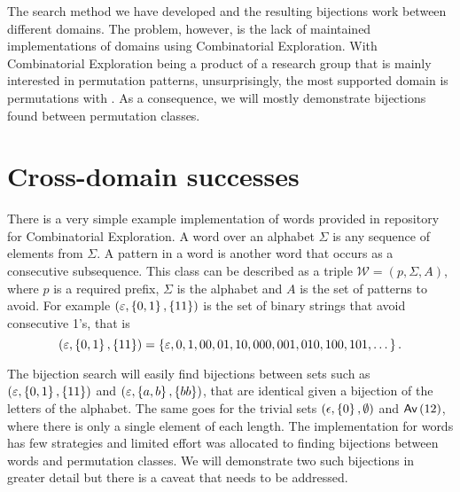 
\label{ch:results}
The search method we have developed and the resulting bijections work between different domains. The problem, however, is the lack of maintained implementations of domains using Combinatorial Exploration. With Combinatorial Exploration being a product of a research group that is mainly interested in permutation patterns, unsurprisingly, the most supported domain is permutations with \tsc{}. As a consequence, we will mostly demonstrate bijections found between permutation classes.

\section{Cross-domain successes}
There is a very simple example implementation of words provided in repository for Combinatorial Exploration. A word over an alphabet $\Sigma$ is any sequence of elements from $\Sigma$. A pattern in a word is another word that occurs as a consecutive subsequence. This class can be described as a triple $\mathcal{W} = (p, \Sigma, A)$, where $p$ is a required prefix, $\Sigma$ is the alphabet and $A$ is the set of patterns to avoid. For example $(\varepsilon, \left\{0,1\right\}, \left\{11\right\})$ is the set of binary strings that avoid consecutive 1's, that is
\[
    (\varepsilon, \left\{0,1\right\}, \left\{11\right\}) = \left\{\varepsilon, 0, 1, 00, 01, 10, 000, 001, 010, 100, 101, \dotsc\right\}.
\]


The bijection search will easily find bijections between sets such as $(\varepsilon, \left\{0,1\right\}, \left\{11\right\})$ and $(\varepsilon, \left\{a,b\right\}, \left\{bb\right\})$, that are identical given a bijection of the letters of the alphabet. The same goes for the trivial sets $(\epsilon, \left\{0\right\}, \emptyset)$ and $\textsf{Av}\left(12\right)$, where there is only a single element of each length. The implementation for words has few strategies and limited effort was allocated to finding bijections between words and permutation classes. We will demonstrate two such bijections in greater detail but there is a caveat that needs to be addressed.

